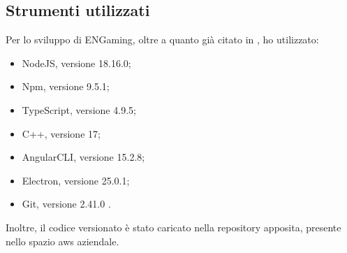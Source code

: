 \subsection{Strumenti utilizzati}
Per lo sviluppo di ENGaming, oltre a quanto già citato in , ho utilizzato:

\begin{itemize}
    \item NodeJS, versione 18.16.0;
    \item Npm, versione 9.5.1;
    \item TypeScript, versione 4.9.5;
    \item C++, versione 17;
    \item AngularCLI, versione 15.2.8;
    \item Electron, versione 25.0.1;
    \item Git, versione 2.41.0 .
\end{itemize}
Inoltre, il codice versionato è stato caricato nella repository apposita, presente nello spazio \gls{aws} aziendale.
